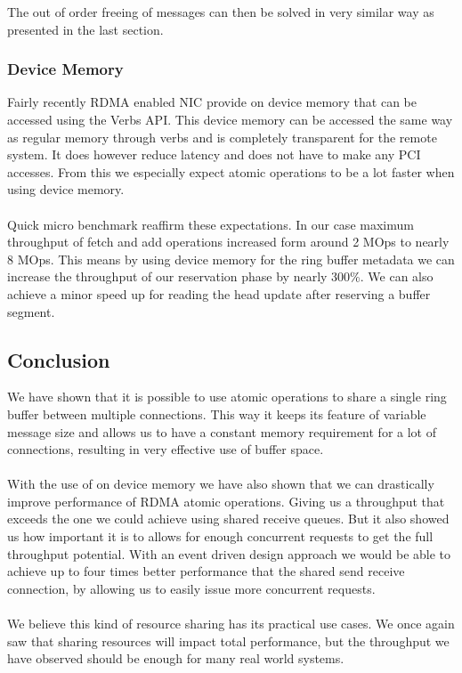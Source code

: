 The out of order freeing of messages can then be solved in very similar way as presented in the last section.


\subsubsection{Device Memory}
Fairly recently RDMA enabled NIC provide on device memory that can be accessed using the Verbs API. This device memory can 
be accessed the same way as regular memory through verbs and is completely transparent for the remote system. It does however
reduce latency and does not have to make any PCI accesses. From this we especially expect atomic operations to be a lot faster
when using device memory.

\paragraph{} Quick micro benchmark reaffirm these expectations. In our case maximum throughput of fetch and add operations 
increased form around 2 MOps to nearly 8 MOps. This means by using device memory for the ring buffer metadata we can increase
the throughput of our reservation phase by nearly 300\%. We can also achieve a minor speed up for reading the head update after
reserving a buffer segment.


\subsection{Conclusion}

We have shown that it is possible to use atomic operations to share a single ring buffer between multiple connections. This
way it keeps its feature of variable message size and allows us to have a constant memory requirement for a lot of connections,
resulting in very effective use of buffer space.

\paragraph{} With the use of on device memory we have also shown that we can drastically improve performance of RDMA atomic 
operations. Giving us a throughput that exceeds the one we could achieve using shared receive queues. But it 
also showed us how important it is to allows for enough concurrent requests to get the full throughput potential. 
With an event driven design approach we would be able to achieve up to four times better performance that the shared
send receive connection, by allowing us to easily issue more concurrent requests.

\paragraph{} We believe this kind of resource sharing has its practical use cases. We once again saw that sharing resources
will impact total performance, but the throughput we have observed should be enough for many real world systems. 
